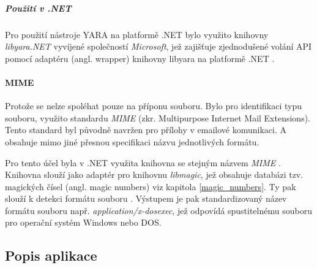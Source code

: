 \noindent
\begin{minipage}[t]{1\textwidth}
    
\end{minipage}





\subparagraph*{Použití v .NET}

Pro použití nástroje YARA na platformě .NET bylo využito knihovny \emph{libyara.NET} vyvíjené společností \emph{Microsoft}, jež zajišťuje zjednodušené volání API pomocí adaptéru (angl. wrapper) knihovny libyara na platformě .NET \cite{github_yaradotnet}. 

\paragraph*{MIME}
\label{lib_mime}
Protože se nelze spoléhat pouze na příponu souboru. Bylo pro identifikaci typu souboru, využito standardu \emph{MIME} (zkr. Multipurpose Internet Mail Extensions). Tento standard byl původně navržen pro přílohy v emailové komunikaci. A obsahuje mimo jiné přesnou specifikaci názvu jednotlivých formátu.


Pro tento účel byla v .NET využita knihovna se stejným názvem \emph{MIME} \cite{libmagic_net}. Knihovna slouží jako adaptér pro knihovnu \emph{libmagic}, jež obsahuje databázi tzv. magických čísel (angl. magic numbers) viz kapitola \ref{magic_numbers}. Ty pak slouží k detekci formátu souboru \cite{libmagic_net}. Výstupem je pak standardizovaný název formátu souboru např. \emph{application/x-dosexec}, jež odpovídá spustitelnému souboru pro operační systém Windows nebo DOS.



\subsection{Popis aplikace}
\label{process_analysis}

